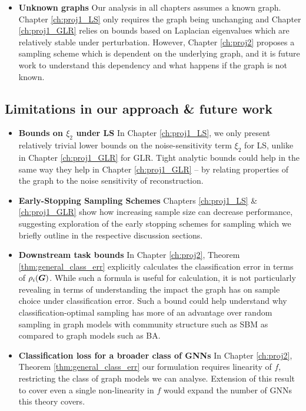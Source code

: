 \begin{itemize}
    \item \textbf{Unknown graphs} Our analysis in all chapters assumes a known graph. Chapter \ref{ch:proj1_LS} only requires the graph being unchanging and Chapter \ref{ch:proj1_GLR} relies on bounds based on Laplacian eigenvalues which are relatively stable under perturbation. However, Chapter \ref{ch:proj2} proposes a sampling scheme which is dependent on the underlying graph, and it is future work to understand this dependency and what happens if the graph is not known.
\end{itemize}

\subsection{Limitations in our approach \& future work}
\begin{itemize}
    \item \textbf{Bounds on $\xi_{2}$ under LS} In Chapter \ref{ch:proj1_LS}, we only present relatively trivial lower bounds on the noise-sensitivity term $\xi_{2}$ for LS, unlike in Chapter \ref{ch:proj1_GLR} for GLR. Tight analytic bounds could help in the same way they help in Chapter \ref{ch:proj1_GLR} -- by relating properties of the graph to the noise sensitivity of reconstruction.
    \item \textbf{Early-Stopping Sampling Schemes} Chapters \ref{ch:proj1_LS} \& \ref{ch:proj1_GLR} show how increasing sample size can decrease performance, suggesting exploration of the early stopping schemes for sampling which we briefly outline in the respective discussion sections.
    \item \textbf{Downstream task bounds} In Chapter \ref{ch:proj2}, Theorem \ref{thm:general_class_err} explicitly calculates the classification error in terms of $\rho_{i}(\bm{G})$. While such a formula is useful for calculation, it is not particularly revealing in terms of understanding the impact the graph has on sample choice under classification error. Such a bound could help understand why classification-optimal sampling has more of an advantage over random sampling in graph models with community structure such as SBM as compared to graph models such as BA.
    \item \textbf{Classification loss for a broader class of GNNs} In Chapter \ref{ch:proj2}, Theorem \ref{thm:general_class_err} our formulation requires linearity of $f$, restricting the class of graph models we can analyse. Extension of this result to cover even a single non-linearity in $f$ would expand the number of GNNs this theory covers.
\end{itemize}


